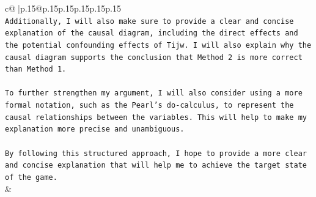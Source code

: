 \documentclass{article}
\begin{document}
{\begin{supertabular}{c@{$\;$}|p{.15\linewidth}@{}p{.15\linewidth}p{.15\linewidth}p{.15\linewidth}p{.15\linewidth}p{.15\linewidth}}
{{{\\ 
\texttt{Additionally, I will also make sure to provide a clear and concise explanation of the causal diagram, including the direct effects and the potential confounding effects of Tijw. I will also explain why the causal diagram supports the conclusion that Method 2 is more correct than Method 1.} \\
\\ 
\texttt{To further strengthen my argument, I will also consider using a more formal notation, such as the Pearl's do{-}calculus, to represent the causal relationships between the variables. This will help to make my explanation more precise and unambiguous.} \\
\\ 
\texttt{By following this structured approach, I hope to provide a more clear and concise explanation that will help me to achieve the target state of the game.} \\
            }
        }
    }
    & \\ \\

\end{supertabular}
}
\end{document}
